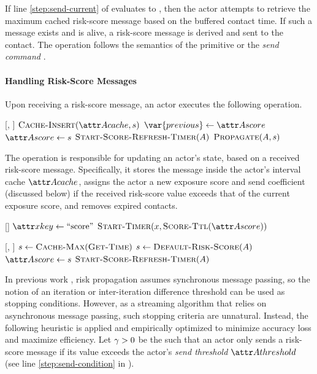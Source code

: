 If line \ref{step:send-current} of \cSendCurrentOrCached[] evaluates to \false, then the actor attempts to retrieve the maximum cached risk-score message based on the buffered contact time. If such a message exists and is alive, a risk-score message is derived and sent to the contact. The \cSend[] operation follows the semantics of the  primitive \cite{AghaThesis1985, Agha1990} or the \emph{send command} \cite{Agha1985}.

\paragraph{Handling Risk-Score Messages}

Upon receiving a risk-score message, an actor executes the following operation.
%
\begin{function}{\nHandleScoreMessage}[\vActor, \vScore]
    \State $\cCacheInsert[\aActorCache, \vScore]$
    \If{$\aScoreValue > \aActorScoreValue$}
    	\State $\var{previous} \assign \aActorScore$
    	\State $\aActorScore \assign \vScore$
    		\State $\cStartScoreRefreshTimer[\vActor]$
    	\EndIf
    \EndIf
    \State $\cPropagate[\vActor, \vScore]$
\end{function}
%
The  operation is responsible for updating an actor's state, based on a received risk-score message. Specifically, it stores the message inside the actor's interval cache $\aActorCache$, assigns the actor a new exposure score and send coefficient (discussed below) if the received risk-score value exceeds that of the current exposure score, and removes expired contacts.
%
\begin{function}{\nStartScoreRefreshTimer}[\vActor]
    \State $\aTimerKey \assign \text{``score''}$
    \State $\cStartTimer[\vTimer, \cScoreTtl[\aActorScore]]$
\end{function}
\begin{function}{\nHandleScoreRefreshTimer}[\vActor, \vTimer]
    \State $\vScore \assign \cCacheMax[\cGetTime]$
    \If{$\vScore \equals \nil$}
    	\State $\vScore \assign \cDefaultScore[\vActor]$
    \EndIf
    \State $\aActorScore \assign \vScore$
    \If{$\vScore \notEquals \cDefaultScore[\vActor]$}
    	\State $\cStartScoreRefreshTimer[\vActor]$
    \EndIf
\end{function}
%
In previous work \cite{Ayday2021}, risk propagation assumes synchronous message passing, so the notion of an iteration or inter-iteration difference threshold can be used as stopping conditions. However, as a streaming algorithm that relies on asynchronous message passing, such stopping criteria are unnatural. Instead, the following heuristic is applied and empirically optimized to minimize accuracy loss and maximize efficiency. Let $\gamma > 0$ be the  such that an actor only sends a risk-score message if its value exceeds the actor's \emph{send threshold} $\aThreshold{\vActor}$ (see line \ref{step:send-condition} in \cPropagate).

